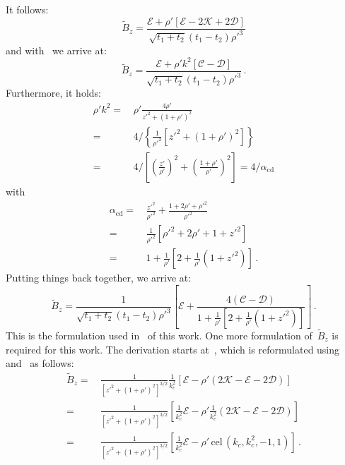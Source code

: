 It follows:
\begin{equation}
  \tilde{B}_z
 = \frac{\mathcal{E} + \rho' \left[\mathcal{E} - 2 \mathcal{K} + 2 \mathcal{D} \right]}
        {\sqrt{t_1 + t_2} (t_1 - t_2) \rho'^3}
\end{equation}
and with~ we arrive at:
\begin{equation}
  \tilde{B}_z
 = \frac{\mathcal{E} + \rho' k^2 \left[\mathcal{C} - \mathcal{D} \right]}
        {\sqrt{t_1 + t_2} (t_1 - t_2) \rho'^3} \, .
\end{equation}
Furthermore, it holds:
\begin{align}
  \rho' k^2
 =&\, \rho' \frac{4 \rho'}{z'^2 + (1 + \rho')^2} \nonumber \\
 =&\, 4 / \left\{ \frac{1}{\rho'^2} \left[ z'^2 + (1 + \rho')^2 \right] \right\} \nonumber \\
 =&\, 4 / \left[ \left( \frac{z'}{\rho'} \right)^2 + \left( \frac{1 + \rho'}{\rho'} \right)^2 \right]
 = 4 / \alpha_\textrm{cd}
\end{align}
with
\begin{align}
  \alpha_\textrm{cd}
 =&\, \frac{z'^2}{\rho'^2} + \frac{1 + 2 \rho' + \rho'^2}{\rho'^2} \nonumber \\
 =&\, \frac{1}{\rho'^2} \left[ \rho'^2 + 2 \rho' + 1 + z'^2 \right] \nonumber \\
 =&\, 1 + \frac{1}{\rho'} \left[ 2 + \frac{1}{\rho'} \left( 1 + z'^2 \right) \right] \, .
\end{align}
Putting things back together, we arrive at:
\begin{equation}
  \tilde{B}_z
 = \frac{1}{\sqrt{t_1 + t_2} (t_1 - t_2) \rho'^3}
   \left[
     \mathcal{E} + \frac{4 \left(\mathcal{C} - \mathcal{D} \right)}{1 + \frac{1}{\rho'} \left[ 2 + \frac{1}{\rho'} \left( 1 + z'^2 \right) \right]}
   \right] \, .
\end{equation}
This is the formulation used in~ of this work.
One more formulation of~$\tilde{B}_z$ is required for this work.
The derivation starts at~, which is reformulated
using~ and~ as follows:
\begin{align}
 \tilde{B}_z
 =&\, \frac{1}{\left[z'^2 + (1 + \rho')^2\right]^{3/2}} \frac{1}{k_c^2}
      \left[ \mathcal{E} -\rho' \left( 2 \mathcal{K} - \mathcal{E} - 2 \mathcal{D} \right) \right] \nonumber \\
 =&\, \frac{1}{\left[z'^2 + (1 + \rho')^2\right]^{3/2}}
      \left[ \frac{1}{k_c^2} \mathcal{E} - \rho' \frac{1}{k_c^2} \left( 2 \mathcal{K} - \mathcal{E} - 2 \mathcal{D} \right) \right] \nonumber \\
 =&\, \frac{1}{\left[z'^2 + (1 + \rho')^2\right]^{3/2}}
      \left[ \frac{1}{k_c^2} \mathcal{E} - \rho' \,\textrm{cel}\,(k_c, k_c^2, -1, 1) \right] \, .
\end{align}
